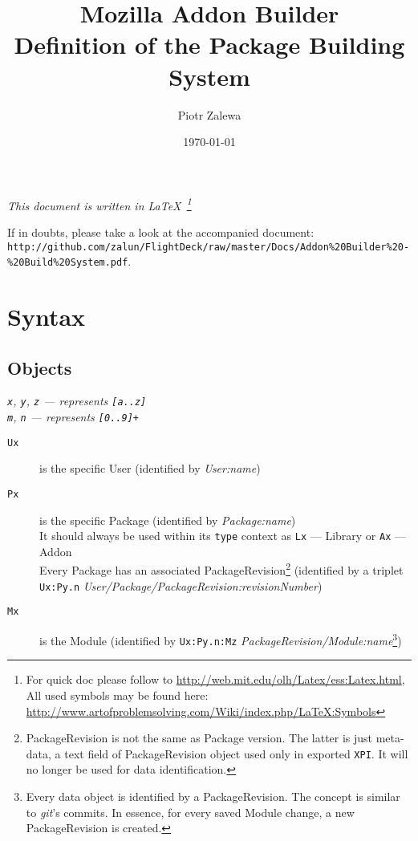 \documentclass[10pt]{article}
\title{Mozilla Addon Builder\\ Definition of the Package Building System}
\author{Piotr Zalewa}
\date{\today}
\def\xpi{{\tt XPI}}
\begin{document}
\maketitle

\noindent\hfill{\small \em This document is written in \LaTeX\ \footnote{For quick doc please follow to \url{http://web.mit.edu/olh/Latex/ess:Latex.html}, All used symbols may be found here: \url{http://www.artofproblemsolving.com/Wiki/index.php/LaTeX:Symbols}}}

\noindent If in doubts, please take a look at the accompanied document:\\ {\tt http://github.com/zalun/FlightDeck/raw/master/Docs/Addon\%20Builder\%20-\%20Build\%20System.pdf}.

\section{Syntax}

	\subsection{Objects}
	
	{\em \small {\tt x}, {\tt y}, {\tt z} --- represents {\tt [a..z]}\\
	{\tt m}, {\tt n} --- represents {\tt [0..9]+}}
	
	\begin{description}
		\item[{\tt Ux}] is the specific User (identified by {\em User:name})
		\item[{\tt Px}] is the specific Package (identified by {\em Package:name})\\
			It should always be used within its {\tt type} context as {\tt Lx} --- Library or {\tt Ax} --- Addon\\
			Every Package has an associated PackageRevision\footnote{PackageRevision is not the same as Package version. The latter is just meta-data, a text field of PackageRevision object used only in exported \xpi. It will no longer be used for data identification.} (identified by a triplet {\tt Ux:Py.n} {\em User/Package/PackageRevision:revisionNumber})
		\item[{\tt Mx}] is the Module (identified by {\tt Ux:Py.n:Mz} {\em PackageRevision/Module:name}\footnote{Every data object is identified by a PackageRevision. The concept is similar to {\em git}'s commits. In essence, for every saved Module change, a new PackageRevision is created.})
	\end{description}
\end{document}
